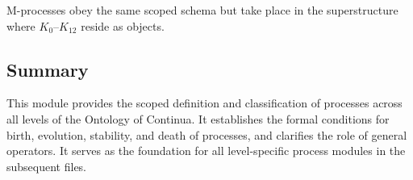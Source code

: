 M-processes obey the same scoped schema but take place in the
superstructure where $K_0$--$K_{12}$ reside as objects.

\subsection{Summary}

This module provides the scoped definition and classification of processes
across all levels of the Ontology of Continua.
It establishes the formal conditions for birth, evolution, stability,
and death of processes, and clarifies the role of general operators.
It serves as the foundation for all level-specific process modules in
the subsequent files.
